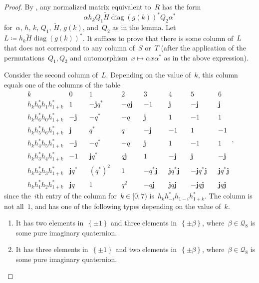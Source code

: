 \documentclass[12pt]{article}
\numberwithin{equation}{section}
\newcommand{\qj}{\mathbf{j}}
\newcommand{\Q}{\mathcal{Q}}
\newcommand{\adjoint}{*}
\newcommand{\eqdef}{\coloneqq}
\newcommand{\set}[1]{\left\{ #1 \right\}}
\DeclareMathOperator{\diag}{diag}
\newcommand{\tH}{\widetilde{H}}
\begin{document}
\begin{proof}
By , any normalized matrix equivalent to~$R$ has the form
\[
\alpha h_k Q_1 \tH \diag(g(k))^\adjoint Q_2 \alpha^*
\]
for~$\alpha$, $h$, $k$, $Q_1$, $\tH$, $g(k)$, and~$Q_2$ as in the lemma. Let~$L \eqdef h_k \tH \diag(g(k))^\adjoint $.
It suffices to prove that there is some column of~$L$ that does not correspond to any column of~$S$ or~$T$ (after the application of the permutations~$Q_1, Q_2$ and automorphism~$x \mapsto \alpha x \alpha^*$ as in the above expression).

Consider the second column of~$L$.
Depending on the value of~$k$, this column equals one of the columns of the table
\begin{equation}
\label{eq-2nd-column}
\begin{array}{c|cccccccccccccc}
k & 0 && 1 && 2 && 3 && 4 && 5 && 6 \\
\hline
h_k h_{0}^* h_{1} h_{1+k}^*  & 1 && -\qj q^* && -q \qj && -1 && \qj && -\qj && \qj \\
h_k h_{6}^* h_{0} h_{1+k}^*  & -\qj && -q^* && -q && \qj && 1 && -1 && 1 \\
h_k h_{5}^* h_{6} h_{1+k}^*  & \qj && q^* && q && -\qj && -1 && 1 && -1 \\
h_k h_{4}^* h_{5} h_{1+k}^*  & -\qj && -q^* && -q && \qj && 1 && -1 && 1 \\
h_k h_{3}^* h_{4} h_{1+k}^*  & -1 && \qj q^* && q \qj && 1 && -\qj && \qj && -\qj \\
h_k h_{2}^* h_{3} h_{1+k}^*  & \qj q^* && (q^*)^2 && 1 && -q^* \qj && \qj q^* \qj && -\qj q^* \qj && \qj q^* \qj \\
h_k h_{1}^* h_{2} h_{1+k}^*  & \qj q  && 1 && q^2 && -q \qj && \qj q \qj && -\qj q \qj && \qj q \qj 
\end{array},
\end{equation}
since the~$i$th entry of the column for~$k \in [0,7)$ is~$h_k h_{-i}^* h_{1-i} h_{1+k}^*$.
The column is not all~$1$, and has one of the following types depending on the value of~$k$. 
\begin{enumerate}
\item \label{item-p1}
It has two elements in~$\set{\pm 1}$ and three elements in~$\set{ \pm \beta}$, where~$\beta \in \Q_8$ is some pure imaginary quaternion.

\item \label{item-p2}
It has three elements in~$\set{\pm 1}$ and two elements in~$\set{ \pm \beta}$, where~$\beta \in \Q_8$ is some pure imaginary quaternion.


\end{enumerate}
\end{proof}
\end{document}
